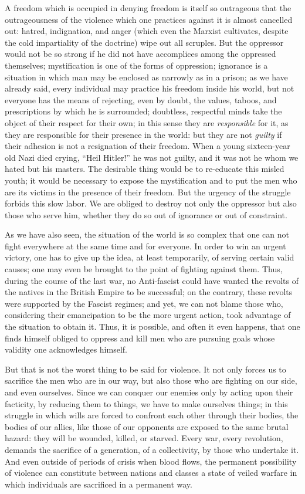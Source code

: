 \documentclass[11pt]{article}
\begin{document}
{{A freedom which is occupied in denying freedom is itself so outrageous that the outrageousness of the violence which one practices against it is almost cancelled out: hatred, indignation, and anger (which even the Marxist cultivates, despite the cold impartiality of the doctrine) wipe out all scruples. But the oppressor would not be so strong if he did not have accomplices among the oppressed themselves; mystification is one of the forms of oppression; ignorance is a situation in which man may be enclosed as narrowly as in a prison; as we have already said, every individual may practice his freedom inside his world, but not everyone has the means of rejecting, even by doubt, the values, taboos, and prescriptions by which he is surrounded; doubtless, respectful minds take the object of their respect for their own; in this sense they are \textit{responsible} for it, as they are responsible for their presence in the world: but they are not \textit{guilty} if their adhesion is not a resignation of their freedom. When a young sixteen-year old Nazi died crying, “Heil Hitler!” he was not guilty, and it was not he whom we hated but his masters. The desirable thing would be to re-educate this misled youth; it would be necessary to expose the mystification and to put the men who are its victims in the presence of their freedom. But the urgency of the struggle forbids this slow labor. We are obliged to destroy not only the oppressor but also those who serve him, whether they do so out of ignorance or out of constraint.

As we have also seen, the situation of the world is so complex that one can not fight everywhere at the same time and for everyone. In order to win an urgent victory, one has to give up the idea, at least temporarily, of serving certain valid causes; one may even be brought to the point of fighting against them. Thus, during the course of the last war, no Anti-fascist could have wanted the revolts of the natives in the British Empire to be successful; on the contrary, these revolts were supported by the Fascist regimes; and yet, we can not blame those who, considering their emancipation to be the more urgent action, took advantage of the situation to obtain it. Thus, it is possible, and often it even happens, that one finds himself obliged to oppress and kill men who are pursuing goals whose validity one acknowledges himself.

But that is not the worst thing to be said for violence. It not only forces us to sacrifice the men who are in our way, but also those who are fighting on our side, and even ourselves. Since we can conquer our enemies only by acting upon their facticity, by reducing them to things, we have to make ourselves things; in this struggle in which wills are forced to confront each other through their bodies, the bodies of our allies, like those of our opponents are exposed to the same brutal hazard: they will be wounded, killed, or starved. Every war, every revolution, demands the sacrifice of a generation, of a collectivity, by those who undertake it. And even outside of periods of crisis when blood flows, the permanent possibility of violence can constitute between nations and classes a state of veiled warfare in which individuals are sacrificed in a permanent way.

}}
\end{document}
